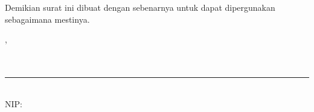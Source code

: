 \documentclass[10pt]{article}
\newcommand{\blade}[1]{}
\newcommand{\spaceblock}{\vspace{1.2em}}
\begin{document}
\spaceblock

Demikian surat ini dibuat dengan sebenarnya untuk dapat dipergunakan sebagaimana mestinya.

\spaceblock

\noindent
\hfill
\begin{minipage}{0.45\textwidth}
    \centering
    \blade{{ $desa->nama }}, \blade{{ $tanggal_surat }} \\[-0.2em]
    \textbf{\blade{!! $penandatangan->jabatan !!}} \\ [4.2em]
    \textbf{\blade{!! $penandatangan->nama !!}} \\ [-0.3em]
    \rule{5.2cm}{0.4pt} \\[-0.2em]
    {\footnotesize NIP: \blade{{ $penandatangan->nip ?? '-' }}}
\end{minipage}
\end{document}
